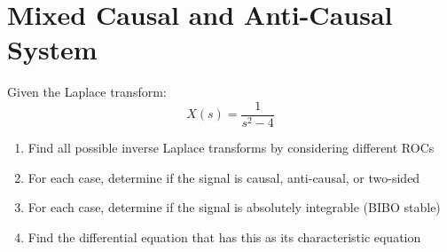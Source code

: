 \documentclass{article}
\begin{document}
\section{Mixed Causal and Anti-Causal System}
Given the Laplace transform:
\[ X(s) = \frac{1}{s^2 - 4} \]
\begin{enumerate}[label=(\alph*)]
    \item Find all possible inverse Laplace transforms by considering different ROCs
    \item For each case, determine if the signal is causal, anti-causal, or two-sided
    \item For each case, determine if the signal is absolutely integrable (BIBO stable)
    \item Find the differential equation that has this as its characteristic equation
\end{enumerate}
\end{document}
